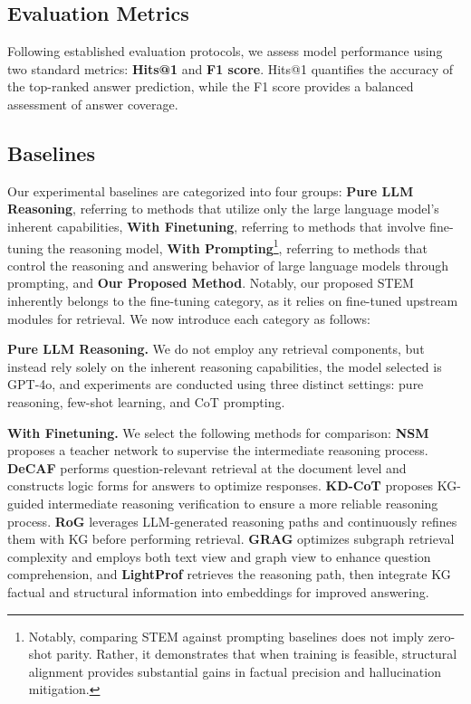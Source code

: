 \documentclass[11pt]{article}
\begin{document}
\subsection{Evaluation Metrics}
Following established evaluation protocols, we assess model performance using two standard metrics: \textbf{Hits@1} and \textbf{F1 score}. Hits@1 quantifies the accuracy of the top-ranked answer prediction, while the F1 score provides a balanced assessment of answer coverage.
\subsection{Baselines}
Our experimental baselines are categorized into four groups: \textbf{Pure LLM Reasoning}, referring to methods that utilize only the large language model's inherent capabilities, \textbf{With Finetuning}, referring to methods that involve fine-tuning the reasoning model, \textbf{With Prompting}\footnote{Notably, comparing STEM against prompting baselines does not imply zero-shot parity. Rather, it demonstrates that when training is feasible, structural alignment provides substantial gains in factual precision and hallucination mitigation. }, referring to methods that control the reasoning and answering behavior of large language models through prompting, and \textbf{Our Proposed Method}. Notably, our proposed STEM inherently belongs to the fine-tuning category, as it relies on fine-tuned upstream modules for retrieval. We now introduce each category as follows: 

\textbf{Pure LLM Reasoning.}
We do not employ any retrieval components, but instead rely solely on the inherent reasoning capabilities, the model selected is GPT-4o, and experiments are conducted using three distinct settings: pure reasoning, few-shot learning, and CoT prompting.

\textbf{With Finetuning.}
We select the following methods for comparison: \textbf{NSM} \cite{he2021improving} proposes a teacher network to supervise the intermediate reasoning process. \textbf{DeCAF} \cite{yu2023decaf} performs question-relevant retrieval at the document level and constructs logic forms for answers to optimize responses. \textbf{KD-CoT} \cite{wang2023knowledgedriven} proposes KG-guided intermediate reasoning verification to ensure a more reliable reasoning process. \textbf{RoG} \cite{luo2024reasoning} leverages LLM-generated reasoning paths and continuously refines them with KG before performing retrieval. \textbf{GRAG} \cite{hu-etal-2025-grag} optimizes subgraph retrieval complexity and employs both text view and graph view to enhance question comprehension, and \textbf{LightProf} \cite{ao2025lightprof} retrieves the reasoning path, then integrate KG factual and structural information into embeddings for improved answering.
\end{document}
